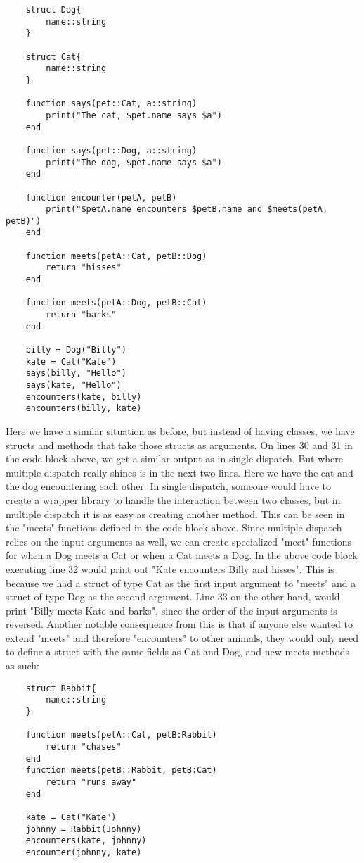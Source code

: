 \begin{lstlisting}
    struct Dog{
        name::string
    }

    struct Cat{
        name::string
    }

    function says(pet::Cat, a::string)
        print("The cat, $pet.name says $a")
    end

    function says(pet::Dog, a::string)
        print("The dog, $pet.name says $a")
    end    

    function encounter(petA, petB)
        print("$petA.name encounters $petB.name and $meets(petA, petB)")
    end

    function meets(petA::Cat, petB::Dog)
        return "hisses"
    end

    function meets(petA::Dog, petB::Cat)
        return "barks"
    end

    billy = Dog("Billy")
    kate = Cat("Kate")
    says(billy, "Hello")
    says(kate, "Hello")
    encounters(kate, billy)
    encounters(billy, kate)

\end{lstlisting}

Here we have a similar situation as before, but instead of having classes, we have structs and methods that take those
structs as arguments. On lines 30 and 31 in the code block above, we get a similar output as in single dispatch. But
where multiple dispatch really shines is in the next two lines. Here we have the cat and the dog encountering each
other. In single dispatch, someone would have to create a wrapper library to handle the interaction between two classes,
but in multiple dispatch it is as easy as creating another method. This can be seen in the "meets" functions defined in
the code block above. Since multiple dispatch relies on the input arguments as well, we can create specialized "meet"
functions for when a Dog meets a Cat or when a Cat meets a Dog. In the above code block executing line 32 would print
out "Kate encounters Billy and hisses". This is because we had a struct of type Cat as the first input argument to
"meets" and a struct of type Dog as the second argument. Line 33 on the other hand, would print "Billy meets Kate and
barks", since the order of the input arguments is reversed. Another notable consequence from this is that if anyone
else wanted to extend "meets" and therefore "encounters" to other animals, they would only need to define a struct with
the same fields as Cat and Dog, and new meets methods as such: \hfill

\begin{lstlisting}
    struct Rabbit{
        name::string
    }

    function meets(petA::Cat, petB:Rabbit)
        return "chases"
    end
    function meets(petB::Rabbit, petB:Cat)
        return "runs away"
    end

    kate = Cat("Kate")
    johnny = Rabbit(Johnny)
    encounters(kate, johnny)
    encounter(johnny, kate)
\end{lstlisting}

